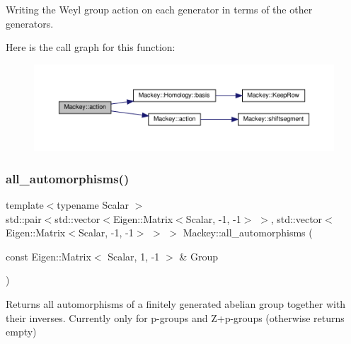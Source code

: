 Writing the Weyl group action on each generator in terms of the other generators. 

Here is the call graph for this function\+:\nopagebreak
\begin{figure}[H]
\begin{center}
\leavevmode
\includegraphics[width=350pt]{namespaceMackey_a2169692139cf46ac28719780e2a7f867_cgraph}
\end{center}
\end{figure}
\mbox{\label{namespaceMackey_ac9020d176548a99b3119cd7bda15941d}} 
\subsubsection{\texorpdfstring{all\+\_\+automorphisms()}{all\_automorphisms()}}
{\footnotesize\ttfamily template$<$typename Scalar $>$ \\
std\+::pair$<$std\+::vector$<$Eigen\+::\+Matrix$<$Scalar, -\/1, -\/1$>$ $>$, std\+::vector$<$Eigen\+::\+Matrix$<$Scalar, -\/1, -\/1$>$ $>$ $>$ Mackey\+::all\+\_\+automorphisms (\begin{DoxyParamCaption}\item[{const Eigen\+::\+Matrix$<$ Scalar, 1, -\/1 $>$ \&}]{Group }\end{DoxyParamCaption})}



Returns all automorphisms of a finitely generated abelian group together with their inverses. Currently only for p-\/groups and Z+p-\/groups (otherwise returns empty) 

